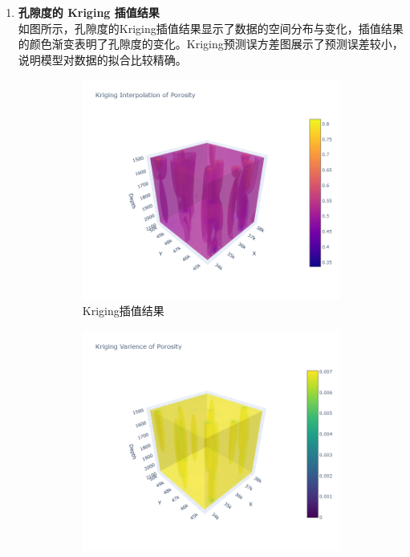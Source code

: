 \documentclass[12pt,a4paper]{nmmcm}
\begin{document}
\begin{enumerate}
  \item \textbf{孔隙度的 Kriging 插值结果} \\
        如图所示，孔隙度的Kriging插值结果显示了数据的空间分布与变化，插值结果的颜色渐变表明了孔隙度的变化。Kriging预测误方差图展示了预测误差较小，说明模型对数据的拟合比较精确。
        \begin{figure}[H]
          \centering
          \begin{subfigure}[b]{0.3\textwidth}
            \centering
            \includegraphics[width=\textwidth]{figures/task2/task2-5-1.png}
            \caption{Kriging插值结果}
            \label{fig:porosity-Kriging-3d}
          \end{subfigure}
          \hfill
          \begin{subfigure}[b]{0.3\textwidth}
            \centering
            \includegraphics[width=\textwidth]{figures/task2/task2-5-2.png}

\end{subfigure}
\end{figure}
\end{enumerate}
\end{document}
